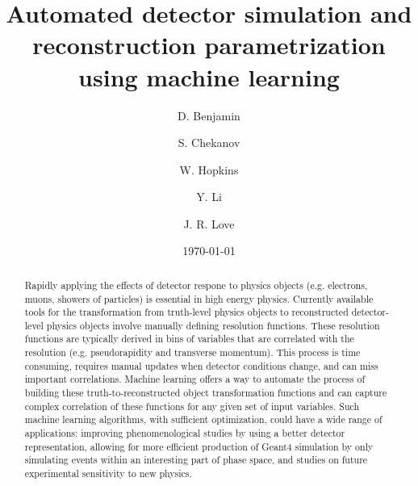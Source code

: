 \documentclass[showpacs,showkeys,preprint,prd,nofootinbib,linenumbers,12pt,superscriptaddress]{revtex4-1}
\begin{document}


\date{\today}

\vspace{2.5cm}

\title{
  Automated detector simulation and reconstruction parametrization using machine learning 
}

\author{D. Benjamin}
\author{S. Chekanov}
\author{W. Hopkins}
\author{Y. Li}
\author{J. R. Love}

\begin{abstract}
Rapidly applying the effects of detector respone to physics objects (e.g. electrons, muons, showers of particles) is essential in high energy physics. Currently available tools for the transformation from truth-level physics objects to reconstructed detector-level physics objects involve manually defining resolution functions. These resolution functions are typically derived in bins of variables that are correlated with the resolution (e.g. pseudorapidity and transverse momentum). This process is time consuming, requires manual updates when detector conditions change, and can miss important correlations. Machine learning offers a way to automate the process of building these truth-to-reconstructed object transformation functions and can capture complex correlation of these functions for any given set of input variables. Such machine learning algorithms, with sufficient optimization, could have a wide range of applications: improving phenomenological studies by using a better detector representation, allowing for more efficient production of Geant4 simulation by only simulating events within an interesting part of phase space, and studies on future experimental sensitivity to new physics.
\end{abstract}
\end{document}
